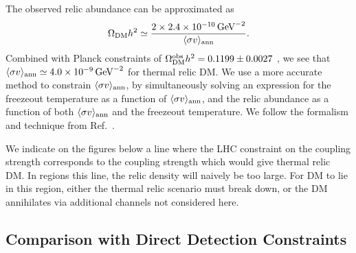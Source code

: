 The observed relic abundance can be approximated as
%
\begin{equation}
  \Omega_{\rm DM}h^2\simeq \frac{2\times2.4\times 10^{-10}\,{\rm GeV}^{-2}}{\langle\sigma v\rangle_{\rm ann}}.
  \label{simplerelic}
\end{equation}
%
Combined with Planck constraints of $\Omega_{\rm DM}^{\rm obs}h^2=0.1199\pm0.0027$ \cite{Ade:2013zuv}, we see that $\langle\sigma v\rangle_{\rm ann}\simeq 4.0\times 10^{-9}\,{\rm GeV}^{-2}$ for thermal relic DM.
%
We use a more accurate method to constrain $\langle\sigma v\rangle_{\rm ann}$, by simultaneously solving an expression for the freezeout temperature as a function of $\langle\sigma v\rangle_{\rm ann}$, and the relic abundance as a function of both $\langle\sigma v\rangle_{\rm ann}$ and the freezeout temperature. We follow the formalism and technique from Ref.~\cite{Busoni:2014gta}.

We indicate on the figures below a line where the LHC constraint on the coupling strength corresponds to the coupling strength which would give thermal relic DM. In regions  this line, the relic density will naively be too large. For DM to lie in this region, either the thermal relic scenario must break down, or the DM annihilates via additional channels not considered here.

\subsection{Comparison with Direct Detection Constraints}
